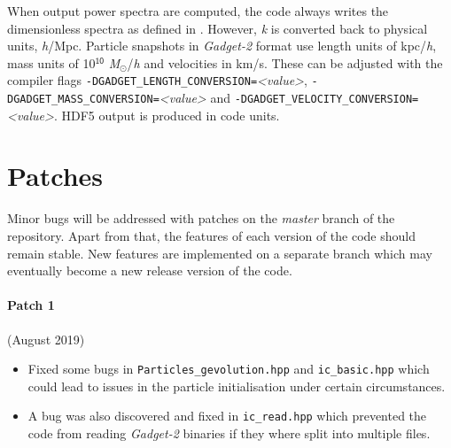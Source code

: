 \documentclass[a4paper,10pt]{article}
\begin{document}
When output power spectra are computed, the code always writes the dimensionless spectra as defined in \cite{Adamek:2015eda}. However,
\textit{k} is converted back to physical units, \textit{h}/Mpc. Particle snapshots in \textit{Gadget-2} format use length units of
kpc/\textit{h}, mass units of 10$^\mathsf{10}$ \textit{M}$_\odot$/\textit{h} and velocities in km/s. These can be adjusted with the compiler
flags \texttt{-DGADGET\_LENGTH\_CONVERSION=}\textit{<value>}, \texttt{-DGADGET\_MASS\_CONVERSION=}\textit{<value>} and
\texttt{-DGADGET\_VELOCITY\_CONVERSION=}\textit{<value>}. HDF5 output is produced in code units.

\section{Patches}

Minor bugs will be addressed with patches on the \textit{master} branch of the repository. Apart from that, the features of each version of
the code should remain stable. New features are implemented on a separate branch which may eventually become a new release version of the
code.

\paragraph{Patch 1} (August 2019)
\begin{itemize}
\item Fixed some bugs in \texttt{Particles\_gevolution.hpp} and \texttt{ic\_basic.hpp} which could lead to issues in the particle initialisation under certain circumstances.
\item A bug was also discovered and fixed in \texttt{ic\_read.hpp} which prevented the code from reading \textit{Gadget-2} binaries if they where split into multiple files.
\end{itemize}




\end{document}
